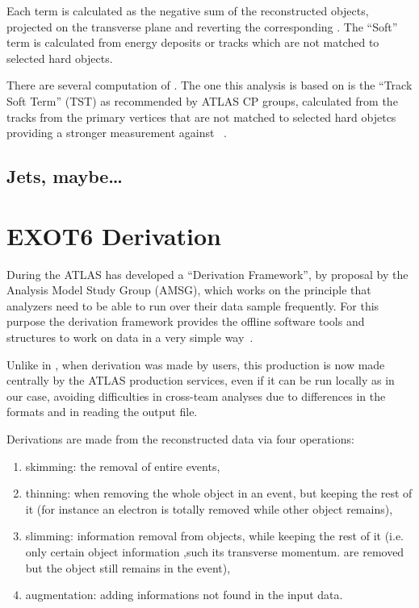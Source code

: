 Each term is calculated as the negative sum of the reconstructed objects, projected on the transverse plane and reverting the corresponding \pt. The ``Soft'' term is calculated from energy deposits or tracks which are not matched to selected hard objects. 

There are several computation of \met. The one this analysis is based on is the ``Track Soft Term'' (TST) as recommended by ATLAS CP groups, calculated from the tracks from the primary vertices that are not matched to selected hard objetcs providing a stronger measurement against \pileup~\cite{Brunt:2013489}.

\subsection{Jets, maybe\dots}

\section{EXOT6 Derivation}
\label{sec:derivation}
During the \RunTwo ATLAS has developed a ``Derivation Framework'', by proposal by the Analysis Model Study Group (AMSG), which works on the principle that analyzers need to be able to run over their data sample frequently. For this purpose the derivation framework provides the offline software tools and structures to work on data in a very simple way~\cite{twiki:DAOD}. 

Unlike in \RunOne, when derivation was made by users, this production is now made centrally by the ATLAS production services, even if it can be run locally as in our case, avoiding difficulties in cross-team analyses due to differences in the formats and in reading the output file.

Derivations are made from the reconstructed data via four operations:
\begin{enumerate}
\item skimming: the removal of entire events,
\item thinning: when removing the whole object in an event, but keeping the rest of it (for instance an electron is totally removed while other object remains),
\item slimming: information removal from objects, while keeping the rest of it (i.e. only certain object information ,such its transverse momentum. are removed but the object still remains in the event),
\item augmentation: adding informations not found in the input data.
\end{enumerate}

